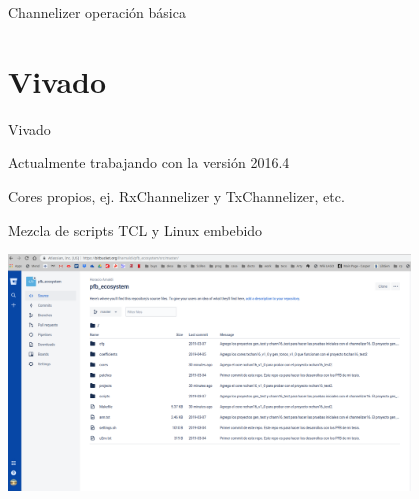 \documentclass[ignorenonframetext,12pt]{beamer}
\begin{document}
\begin{frame}{Channelizer operación básica}
				\begin{center}
				\end{center}
								\begin{center}
								\end{center}
\end{frame}

\section{Vivado}
\begin{frame}{Vivado}

				Actualmente trabajando con la versi\'on 2016.4

				Cores propios, ej. RxChannelizer y TxChannelizer, etc.

				Mezcla de scripts TCL y Linux embebido
				\begin{center}
								\includegraphics[width=0.8\textwidth]{pfb_repo}
				\end{center}
\end{frame}
\end{document}
